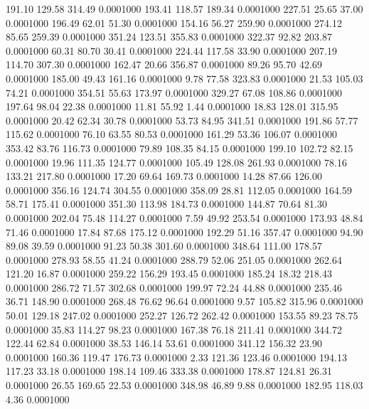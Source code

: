  191.10  129.58  314.49   0.0001000
 193.41  118.57  189.34   0.0001000
 227.51   25.65   37.00   0.0001000
 196.49   62.01   51.30   0.0001000
 154.16   56.27  259.90   0.0001000
 274.12   85.65  259.39   0.0001000
 351.24  123.51  355.83   0.0001000
 322.37   92.82  203.87   0.0001000
  60.31   80.70   30.41   0.0001000
 224.44  117.58   33.90   0.0001000
 207.19  114.70  307.30   0.0001000
 162.47   20.66  356.87   0.0001000
  89.26   95.70   42.69   0.0001000
 185.00   49.43  161.16   0.0001000
   9.78   77.58  323.83   0.0001000
  21.53  105.03   74.21   0.0001000
 354.51   55.63  173.97   0.0001000
 329.27   67.08  108.86   0.0001000
 197.64   98.04   22.38   0.0001000
  11.81   55.92    1.44   0.0001000
  18.83  128.01  315.95   0.0001000
  20.42   62.34   30.78   0.0001000
  53.73   84.95  341.51   0.0001000
 191.86   57.77  115.62   0.0001000
  76.10   63.55   80.53   0.0001000
 161.29   53.36  106.07   0.0001000
 353.42   83.76  116.73   0.0001000
  79.89  108.35   84.15   0.0001000
 199.10  102.72   82.15   0.0001000
  19.96  111.35  124.77   0.0001000
 105.49  128.08  261.93   0.0001000
  78.16  133.21  217.80   0.0001000
  17.20   69.64  169.73   0.0001000
  14.28   87.66  126.00   0.0001000
 356.16  124.74  304.55   0.0001000
 358.09   28.81  112.05   0.0001000
 164.59   58.71  175.41   0.0001000
 351.30  113.98  184.73   0.0001000
 144.87   70.64   81.30   0.0001000
 202.04   75.48  114.27   0.0001000
   7.59   49.92  253.54   0.0001000
 173.93   48.84   71.46   0.0001000
  17.84   87.68  175.12   0.0001000
 192.29   51.16  357.47   0.0001000
  94.90   89.08   39.59   0.0001000
  91.23   50.38  301.60   0.0001000
 348.64  111.00  178.57   0.0001000
 278.93   58.55   41.24   0.0001000
 288.79   52.06  251.05   0.0001000
 262.64  121.20   16.87   0.0001000
 259.22  156.29  193.45   0.0001000
 185.24   18.32  218.43   0.0001000
 286.72   71.57  302.68   0.0001000
 199.97   72.24   44.88   0.0001000
 235.46   36.71  148.90   0.0001000
 268.48   76.62   96.64   0.0001000
   9.57  105.82  315.96   0.0001000
  50.01  129.18  247.02   0.0001000
 252.27  126.72  262.42   0.0001000
 153.55   89.23   78.75   0.0001000
  35.83  114.27   98.23   0.0001000
 167.38   76.18  211.41   0.0001000
 344.72  122.44   62.84   0.0001000
  38.53  146.14   53.61   0.0001000
 341.12  156.32   23.90   0.0001000
 160.36  119.47  176.73   0.0001000
   2.33  121.36  123.46   0.0001000
 194.13  117.23   33.18   0.0001000
 198.14  109.46  333.38   0.0001000
 178.87  124.81   26.31   0.0001000
  26.55  169.65   22.53   0.0001000
 348.98   46.89    9.88   0.0001000
 182.95  118.03    4.36   0.0001000
